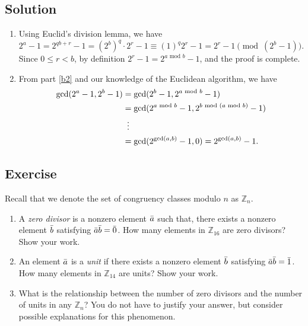 \documentclass{article}
\newcounter{counter}
\newcommand{\Exercise}{Exercise \stepcounter{counter}\thecounter}
\begin{document}
\subsection*{Solution}
    \begin{enumerate}
        \item \label{b2} Using Euclid's division lemma, we have $$2^{a} - 1  = 2^{qb + r} - 1 = (2^{b})^{q} \cdot 2^{r} - 1 \equiv (1)^{q}2^{r} - 1 = 2^{r} - 1  \pmod{(2^{b} - 1)}.$$ Since $0 \le r < b$, by definition $2^{r} - 1 = 2^{a \text{ mod $b$}} - 1$, and the proof is complete.
        \item From part \ref{b2} and our knowledge of the Euclidean algorithm, we have
        $$\begin{aligned}[t]
            \gcd(2^{a} - 1, 2^{b} - 1) &= \gcd(2^{b} - 1, 2^{a \text{ mod $b$}} - 1) \\
            &= \gcd(2^{a \text{ mod $b$}} - 1, 2^{b \text{ mod ($a \text{ mod } b$)}} - 1) \\
            &\vdotswithin{ = } \\
            &= \gcd(2^{\gcd(a, b)} - 1, 0) = 2^{\gcd(a, b)} - 1.
        \end{aligned}$$
    \end{enumerate}

\subsection*{\Exercise}
    Recall that we denote the set of congruency classes modulo $n$ as $\mathbb{Z}_{n}$.
    \begin{enumerate}
        \item A \textit{zero divisor} is a nonzero element $\Bar{a}$ such that, there exists a nonzero element $\Bar{b}$ satisfying $\Bar{a}\Bar{b} = \Bar{0}$. How many elements in $\mathbb{Z}_{16}$ are zero divisors? Show your work.
        \item An element $\Bar{a}$ is a \textit{unit} if there exists a nonzero element $\Bar{b}$ satisfying $\Bar{a}\Bar{b} = \Bar{1}$. How many elements in $\mathbb{Z}_{14}$ are units? Show your work.
        \item What is the relationship between the number of zero divisors and the number of units in any $\mathbb{Z}_{n}$? You do not have to justify your answer, but consider possible explanations for this phenomenon.
    \end{enumerate}
\end{document}
